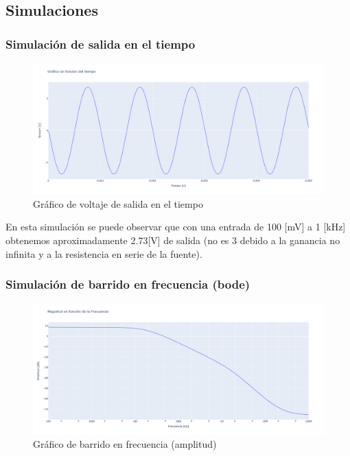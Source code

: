 \newpage
\subsection{Simulaciones}

\subsubsection{Simulación de salida en el tiempo}
 
\begin{figure}[h!]
    \centering
    \includegraphics[width=1.0\linewidth]{img/Lab2_SalidaTiempo.png}
    \caption{Gráfico de voltaje de salida en el tiempo}
    \label{fig:tiempo}
\end{figure}

En esta simulación se puede observar que con una entrada de 100 [mV] a 1 [kHz] obtenemos aproximadamente 2.73[V] de salida (no es 3 debido a la ganancia no infinita y a la resistencia en serie de la fuente).


\subsubsection{Simulación de barrido en frecuencia (bode)}
\begin{figure}[h!]
    \centering
    \includegraphics[width=0.80\linewidth]{img/Lab2_Bode1_amp.png}
    \caption{Gráfico de barrido en frecuencia (amplitud)}
    \label{fig:bode1a}
\end{figure}

